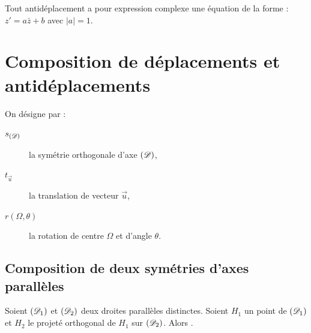       \begin{prop}
	            Tout antid\'eplacement a pour expression complexe une \'equation de la forme :
                  $z' = a\bar{z} + b$ avec $|a| = 1$.
      \end{prop}
      
%
\section{Composition de d\'eplacements et antid\'eplacements}
      On d\'esigne par :
      \begin{description}
            \item[$s_{(\mathscr{D})}$] la sym\'etrie orthogonale d'axe $(\mathscr{D})$,
            \item[$t_{\vec{u}}$] la translation de vecteur $\vec{u}$,
            \item[$r(\Omega,\theta)$] la rotation de centre $\Omega$ et d'angle $\theta$.
      \end{description}
      \subsection{Composition de deux sym\'etries d'axes parall\`eles}
            Soient $(\mathscr{D}_1)$ et $(\mathscr{D}_2)$ deux droites parall\`eles distinctes.
            Soient $H_1$ un point de $(\mathscr{D}_1)$ et $H_2$ le projet\'e orthogonal de $H_1$ sur $(\mathscr{D}_2)$.
            Alors .
            
